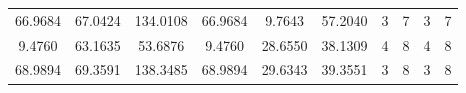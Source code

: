 \documentclass[withoutpreface,bwprint]{cumcmthesis}
\begin{document}
\begin{appendices}
\begin{table}[htbp!]
\begin{tabular}{@{}cccccccccc@{}}
				66.9684                          & 67.0424                          & 134.0108                         & 66.9684                          & 9.7643                           & 57.2040                          & 3                    & 7                    & 3                      & 7                      \\
				9.4760                           & 63.1635                          & 53.6876                          & 9.4760                           & 28.6550                          & 38.1309                          & 4                    & 8                    & 4                      & 8                      \\
				68.9894                          & 69.3591                          & 138.3485                         & 68.9894                          & 29.6343                          & 39.3551                          & 3                    & 8                    & 3                      & 8                      \\ \bottomrule
			\end{tabular}
		\end{table}
		

\end{appendices}
\end{document}
